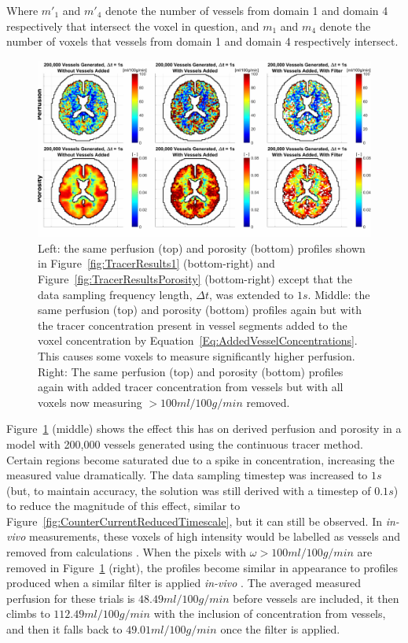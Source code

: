 \documentclass[11pt,english,a4paper,twoside,openright]{report}
\begin{document}
{{{{{{{Where $m'_{1}$ and $m'_{4}$ denote the number of vessels from domain 1 and domain 4 respectively that intersect the voxel in question, and $m_{1}$ and $m_{4}$ denote the number of voxels that vessels from domain 1 and domain 4 respectively intersect. 

\begin{figure}[h]
	\centering
	\includegraphics[width=\textwidth]{Chapter4/AddedVessels}
	\caption[Perfusion and porosity profiles generated using the continuous tracer method including the indicator present within the vessel domains]{Left: the same perfusion (top) and porosity (bottom) profiles shown in Figure~\ref{fig:TracerResults1} (bottom-right) and Figure~\ref{fig:TracerResultsPorosity} (bottom-right) except that the data sampling frequency length, $\Delta t$, was extended to $1s$. Middle: the same perfusion (top) and porosity (bottom) profiles again but with the tracer concentration present in vessel segments added to the voxel concentration by Equation~\ref{Eq:AddedVesselConcentrations}. This causes some voxels to measure significantly higher perfusion. Right: The same perfusion (top) and porosity (bottom) profiles again with added tracer concentration from vessels but with all voxels now measuring {$>$}$100ml/100g/min$ removed.}
	\label{fig:AddedVessels}
\end{figure}

Figure~\ref{fig:AddedVessels} (middle) shows the effect this has on derived perfusion and porosity in a model with 200,000 vessels generated using the continuous tracer method. Certain regions become saturated due to a spike in concentration, increasing the measured value dramatically. The data sampling timestep was increased to $1s$ (but, to maintain accuracy, the solution was still derived with a timestep of $0.1s$) to reduce the magnitude of this effect, similar to Figure~\ref{fig:CounterCurrentReducedTimescale}, but it can still be observed. In \textit{in-vivo} measurements, these voxels of high intensity would be labelled as vessels and removed from calculations \cite{teng2013improvements}. When the pixels with $\omega{>}100ml/100g/min$ are removed in Figure~\ref{fig:AddedVessels} (right), the profiles become similar in appearance to profiles produced when a similar filter is applied \textit{in-vivo} \cite{kudo2003quantitative}. The averaged measured perfusion for these trials is $48.49ml/100g/min$ before vessels are included, it then climbs to $112.49ml/100g/min$ with the inclusion of concentration from vessels, and then it falls back to $49.01ml/100g/min$ once the filter is applied. 

}}}}}}}
\end{document}
